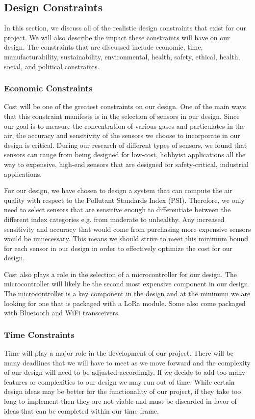 \subsection{Design Constraints}
In this section, we discuss all of the realistic design constraints that exist for our project. We will also describe the impact these constraints will have on our design. The constraints that are discussed include economic, time, manufacturability, sustainability, environmental, health, safety, ethical, health, social, and political constraints.

\subsubsection{Economic Constraints}
Cost will be one of the greatest constraints on our design. One of the main ways that this constraint manifests is in the selection of sensors in our design. Since our goal is to measure the concentration of various gases and particulates in the air, the accuracy and sensitivity of the sensors we choose to incorporate in our design is critical. During our research of different types of sensors, we found that sensors can range from being designed for low-cost, hobbyist applications all the way to expensive, high-end sensors that are designed for safety-critical, industrial applications. 

For our design, we have chosen to design a system that can compute the air quality with respect to the Pollutant Standards Index (PSI). Therefore, we only need to select sensors that are sensitive enough to differentiate between the different index categories e.g. from moderate to unhealthy. Any increased sensitivity and accuracy that would come from purchasing more expensive sensors would be unnecessary. This means we should strive to meet this minimum bound for each sensor in our design in order to effectively optimize the cost for our design.

Cost also plays a role in the selection of a microcontroller for our design. The microcontroller will likely be the second most expensive component in our design. The microcontroller is a key component in the design and at the minimum we are looking for one that is packaged with a LoRa module. Some also come packaged with Bluetooth and WiFi transceivers.

\subsubsection{Time Constraints}
Time will play a major role in the development of our project. There will be many deadlines that we will have to meet as we move forward and the complexity of our design will need to be adjusted accordingly. If we decide to add too many features or complexities to our design we may run out of time. While certain design ideas may be better for the functionality of our project, if they take too long to implement then they are not viable and must be discarded in favor of ideas that can be completed within our time frame.

